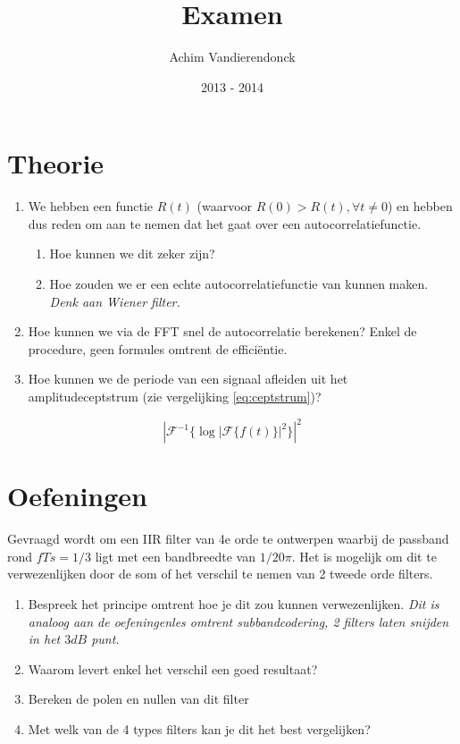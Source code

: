 \documentclass[a4paper]{article}
\title{Examen}
\author{Achim Vandierendonck}
\date{2013 - 2014}
\begin{document}
\maketitle

\section{Theorie}
\begin{enumerate}
	\item We hebben een functie $R(t)$ (waarvoor $R(0) > R(t), \forall t \neq 0$) en hebben dus reden om aan te nemen dat het gaat over een autocorrelatiefunctie.
	\begin{enumerate}
		\item Hoe kunnen we dit zeker zijn?
		\item Hoe zouden we er een echte autocorrelatiefunctie van kunnen maken. \textit{Denk aan Wiener filter.}
	\end{enumerate}
	\item Hoe kunnen we via de FFT snel de autocorrelatie berekenen? Enkel de procedure, geen formules omtrent de efficiëntie.
	\item Hoe kunnen we de periode van een signaal afleiden uit het amplitudeceptstrum (zie vergelijking \ref{eq:ceptstrum})?
\end{enumerate}

\begin{equation}
	|\mathcal{F}^{-1}\{\log{|\mathcal{F}\{f(t)\}|^2}\}|^2
	\label{eq:ceptstrum}
\end{equation}

\section{Oefeningen}
Gevraagd wordt om een IIR filter van 4e orde te ontwerpen waarbij de passband rond $fTs = 1/3$ ligt met een bandbreedte van $1/20\pi$. Het is mogelijk om dit te verwezenlijken door de som of het verschil te nemen van 2 tweede orde filters.
\begin{enumerate}
	\item Bespreek het principe omtrent hoe je dit zou kunnen verwezenlijken. \textit{Dit is analoog aan de oefeningenles omtrent subbandcodering, 2 filters laten snijden in het $3dB$ punt.}
	\item Waarom levert enkel het verschil een goed resultaat?
	\item Bereken de polen en nullen van dit filter
	\item Met welk van de 4 types filters kan je dit het best vergelijken?
\end{enumerate}
\end{document}
